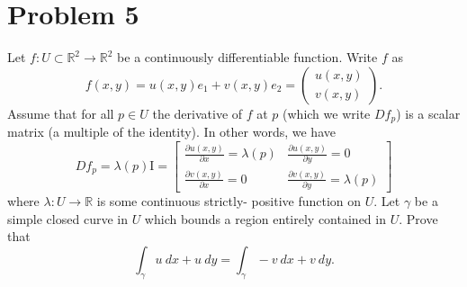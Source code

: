 \documentclass[11pt]{article}
\begin{document}
\section*{Problem 5}
\begin{problem}
    Let $f:U\subset\mathbb{R}^2\rightarrow\mathbb{R}^2$ be a continuously
differentiable function. Write $f$ as
\begin{equation*}
f(x,y)=u(x,y)e_1+v(x,y)e_2=\begin{pmatrix}u(x,y) \\ v(x,y)\end{pmatrix}.
\end{equation*}
\noindent Assume that for all $p\in U$ the derivative of $f$ at $p$ (which we write
$Df_p$) is a scalar matrix (a multiple of the identity). In other words, we have
\begin{equation*}
Df_p= \lambda(p) \mathrm{I} = \begin{bmatrix}
    \frac{\partial u(x,y)}{\partial x} = \lambda(p) & \frac{\partial u(x,y)}{\partial y} = 0\\
    \frac{\partial v(x,y)}{\partial x} = 0 & \frac{\partial v(x,y)}{\partial y} = \lambda(p)
\end{bmatrix}
\end{equation*}
\noindent where $\lambda:U\rightarrow\mathbb{R}$ is some continuous strictly-
positive function on $U$. Let $\gamma$ be a simple closed curve in $U$ which bounds
a region entirely contained in $U$. Prove that
\begin{equation*}
\int_\gamma u\:dx+u\:dy=\int_\gamma-v\:dx+v\:dy.
\end{equation*}
\end{problem}
\end{document}
